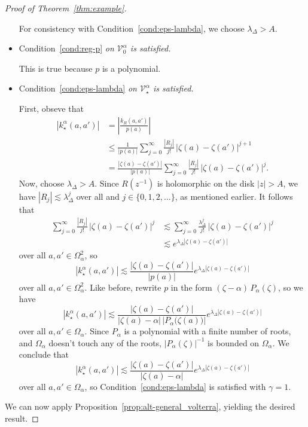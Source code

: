 \documentclass{article}
\theoremstyle{definition}
\theoremstyle{plain}
\newcommand{\hardpart}{\mathcal{V}_0}
\newcommand{\softpart}{\mathcal{V}_\star}
\newcommand{\softker}{k_\star}
\newcommand{\domain}{\Omega}
\begin{document}
\begin{proof}[Proof of Theorem~\ref{thm:example}]
\begin{itemize}
For consistency with Condition~\eqref{cond:eps-lambda}, we choose $\lambda_\Delta > A$.
\item Condition~\eqref{cond:reg-p} {\em on $\hardpart^\alpha$ is satisfied.}

This is true because $p$ is a polynomial.
\item Condition~\eqref{cond:eps-lambda} {\em on $\softpart^\alpha$ is satisfied.} 

First, obseve that
\begin{align*}
|\softker^\alpha(a, a')| & = \left|\frac{k_R(a, a')}{p(a)}\right| \\
& \le \frac{1}{|p(a)|} \sum_{j=0}^\infty \frac{|R_{j}|}{j!} \, |\zeta(a)-\zeta(a')|^{j+1} \\
& = \frac{|\zeta(a)-\zeta(a')|}{|p(a)|} \sum_{j=0}^\infty \frac{|R_{j}|}{j!} \, |\zeta(a)-\zeta(a')|^j.
\end{align*}
Now, choose $\lambda_\Delta > A$. Since $R(z^{-1})$ is holomorphic on the disk $|z| > A$, we have $|R_j| \lesssim \lambda_\Delta^j$ over all and $j \in \{0, 1, 2, \ldots\}$, as mentioned earlier. It follows that
\begin{align*}
\sum_{j=0}^\infty \frac{|R_{j}|}{j!} \, |\zeta(a)-\zeta(a')|^j
& \lesssim \sum_{j=0}^\infty \frac{\lambda_\Delta^j}{j!} \, |\zeta(a)-\zeta(a')|^j \\
& \lesssim e^{\lambda_\Delta|\zeta(a)-\zeta(a')|}
\end{align*}
over all $a, a' \in \domain_\alpha^2$, so
\[ |\softker^\alpha(a, a')| \lesssim \frac{|\zeta(a)-\zeta(a')|}{|p(a)|} e^{\lambda_\Delta|\zeta(a)-\zeta(a')|} \]
over all $a, a' \in \domain_\alpha^2$. Like before, rewrite $p$ in the form $(\zeta - \alpha)\,P_\alpha(\zeta)$, so we have
\[ |\softker^\alpha(a, a')| \lesssim \frac{|\zeta(a)-\zeta(a')|}{|\zeta(a) - \alpha|\,\big|P_\alpha\big(\zeta(a)\big)\big|} e^{\lambda_\Delta|\zeta(a)-\zeta(a')|} \]
over all $a, a' \in \domain_\alpha$. Since $P_\alpha$ is a polynomial with a finite number of roots, and $\domain_\alpha$ doesn't touch any of the roots, $|P_\alpha(\zeta)|^{-1}$ is bounded on $\domain_\alpha$. We conclude that
\[ |\softker^\alpha(a, a')| \lesssim \frac{|\zeta(a)-\zeta(a')|}{|\zeta(a) - \alpha|} e^{\lambda_\Delta|\zeta(a)-\zeta(a')|} \]
over all $a, a' \in \domain_\alpha$, so Condition~\eqref{cond:eps-lambda} is satisfied with $\gamma = 1$.
\end{itemize}
We can now apply Proposition~\ref{prop:alt-general_volterra}, yielding the desired result.
\end{proof}



\end{document}
